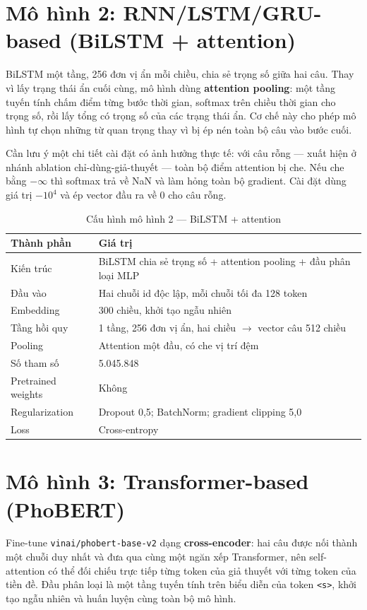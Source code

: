\documentclass[12pt,a4paper,oneside]{report}
\begin{document}
\section{Mô hình 2: RNN/LSTM/GRU-based (BiLSTM + attention)}

BiLSTM một tầng, 256 đơn vị ẩn mỗi chiều, chia sẻ trọng số giữa hai câu. Thay vì lấy trạng
thái ẩn cuối cùng, mô hình dùng \textbf{attention pooling}: một tầng tuyến tính chấm điểm
từng bước thời gian, softmax trên chiều thời gian cho trọng số, rồi lấy tổng có trọng số
của các trạng thái ẩn. Cơ chế này cho phép mô hình tự chọn những từ quan trọng thay vì bị
ép nén toàn bộ câu vào bước cuối.

Cần lưu ý một chi tiết cài đặt có ảnh hưởng thực tế: với câu rỗng --- xuất hiện ở nhánh
ablation chỉ-dùng-giả-thuyết --- toàn bộ điểm attention bị che. Nếu che bằng $-\infty$ thì
softmax trả về NaN và làm hỏng toàn bộ gradient. Cài đặt dùng giá trị $-10^{4}$ và ép
vector đầu ra về 0 cho câu rỗng.

\begin{table}[H]
\centering
\caption{Cấu hình mô hình 2 --- BiLSTM + attention}
\begin{tabularx}{\textwidth}{@{}L{4.5cm}Y@{}}
\toprule
\textbf{Thành phần} & \textbf{Giá trị} \\
\midrule
Kiến trúc & BiLSTM chia sẻ trọng số + attention pooling + đầu phân loại MLP \\
Đầu vào & Hai chuỗi id độc lập, mỗi chuỗi tối đa 128 token \\
Embedding & 300 chiều, khởi tạo ngẫu nhiên \\
Tầng hồi quy & 1 tầng, 256 đơn vị ẩn, hai chiều $\rightarrow$ vector câu 512 chiều \\
Pooling & Attention một đầu, có che vị trí đệm \\
Số tham số & 5.045.848 \\
Pretrained weights & Không \\
Regularization & Dropout 0,5; BatchNorm; gradient clipping 5,0 \\
Loss & Cross-entropy \\
\bottomrule
\end{tabularx}
\end{table}

\section{Mô hình 3: Transformer-based (PhoBERT)}

Fine-tune \texttt{vinai/phobert-base-v2} \cite{phobert} dạng \textbf{cross-encoder}: hai
câu được nối thành một chuỗi duy nhất và đưa qua cùng một ngăn xếp Transformer, nên
self-attention có thể đối chiếu trực tiếp từng token của giả thuyết với từng token của
tiền đề. Đầu phân loại là một tầng tuyến tính trên biểu diễn của token \texttt{<s>}, khởi
tạo ngẫu nhiên và huấn luyện cùng toàn bộ mô hình.
\end{document}
